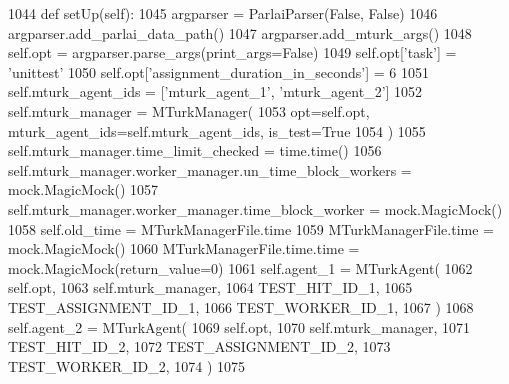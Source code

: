 \begin{DoxyCode}
1044     \textcolor{keyword}{def }setUp(self):
1045         argparser = ParlaiParser(\textcolor{keyword}{False}, \textcolor{keyword}{False})
1046         argparser.add\_parlai\_data\_path()
1047         argparser.add\_mturk\_args()
1048         self.opt = argparser.parse\_args(print\_args=\textcolor{keyword}{False})
1049         self.opt[\textcolor{stringliteral}{'task'}] = \textcolor{stringliteral}{'unittest'}
1050         self.opt[\textcolor{stringliteral}{'assignment\_duration\_in\_seconds'}] = 6
1051         self.mturk\_agent\_ids = [\textcolor{stringliteral}{'mturk\_agent\_1'}, \textcolor{stringliteral}{'mturk\_agent\_2'}]
1052         self.mturk\_manager = MTurkManager(
1053             opt=self.opt, mturk\_agent\_ids=self.mturk\_agent\_ids, is\_test=\textcolor{keyword}{True}
1054         )
1055         self.mturk\_manager.time\_limit\_checked = time.time()
1056         self.mturk\_manager.worker\_manager.un\_time\_block\_workers = mock.MagicMock()
1057         self.mturk\_manager.worker\_manager.time\_block\_worker = mock.MagicMock()
1058         self.old\_time = MTurkManagerFile.time
1059         MTurkManagerFile.time = mock.MagicMock()
1060         MTurkManagerFile.time.time = mock.MagicMock(return\_value=0)
1061         self.agent\_1 = MTurkAgent(
1062             self.opt,
1063             self.mturk\_manager,
1064             TEST\_HIT\_ID\_1,
1065             TEST\_ASSIGNMENT\_ID\_1,
1066             TEST\_WORKER\_ID\_1,
1067         )
1068         self.agent\_2 = MTurkAgent(
1069             self.opt,
1070             self.mturk\_manager,
1071             TEST\_HIT\_ID\_2,
1072             TEST\_ASSIGNMENT\_ID\_2,
1073             TEST\_WORKER\_ID\_2,
1074         )
1075 
\end{DoxyCode}
\mbox{\label{classparlai_1_1mturk_1_1core_1_1legacy__2018_1_1test_1_1test__mturk__manager_1_1TestMTurkManagerTimeHandling_a6ed0a4369336b7f79091d0b7937cc8c5}} 
